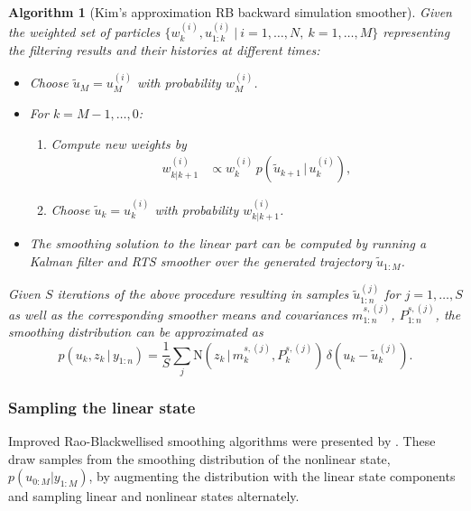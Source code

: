 \documentclass[twocolumn]{autart}    %
\newtheorem{algo}{Algorithm}[section]
\begin{document}
\begin{algo}[Kim's approximation RB backward simulation smoother]
  \label{alg:rbbssmooth}
  Given the weighted set of particles $\{ w_k^{(i)}, u_{1:k}^{(i)} ~|~
  i=1,\ldots,N,~k=1,\ldots,M \}$ representing the filtering results
  and their histories at different times:
\begin{itemize}
\item Choose $\tilde{u}_M = u_M^{(i)}$ with probability $w^{(i)}_{M}$.
\item For $k=M-1,\ldots,0$:
\begin{enumerate}
  \item Compute new weights by
    \begin{equation}
      \begin{split}
        w^{(i)}_{k|k+1} &\propto
        w_k^{(i)} \,
        p(\tilde{u}_{k+1}\,|\,u_{k}^{(i)}),
     \end{split}
    \end{equation}

  \item Choose $\tilde{u}_k = u_k^{(i)}$ with probability
    $w^{(i)}_{k|k+1}$.
  \end{enumerate}
\item The smoothing solution to the linear part can be computed by running a Kalman filter and RTS smoother over the generated trajectory $\tilde{u}_{1:M}$.
\end{itemize}
%
Given $S$ iterations of the above procedure resulting in samples $\tilde{u}_{1:n}^{(j)}$ for $j=1,\ldots,S$ as well as the corresponding smoother means and covariances $m^{s,(j)}_{1:n}$, $P^{s,(j)}_{1:n}$, the smoothing distribution can be approximated as
%
\begin{equation}
  p(u_k,z_k\,|\,y_{1:n})
  = \frac{1}{S} \sum_j \mathrm{N}(z_k\,|\,m_k^{s,(j)},P_k^{s,(j)}) \,
  \delta(u_k - \tilde{u}_k^{(j)}).
\nonumber
\end{equation}
\end{algo}


\subsubsection{Sampling the linear state}
%
Improved Rao-Blackwellised smoothing algorithms were presented by \cite{Fong+Godsill+Doucet+West:2002,Lindsten+Schon:2011}. These draw samples from the smoothing distribution of the nonlinear state, $p(u_{0:M} | y_{1:M})$, by augmenting the distribution with the linear state components and sampling linear and nonlinear states alternately.
\end{document}
